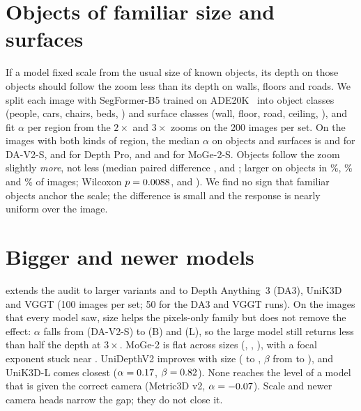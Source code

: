 \documentclass[10pt,twocolumn,letterpaper]{article}
\begin{document}



\section{Objects of familiar size and surfaces}\label{sec:supp_regions}

If a model fixed scale from the usual size of known objects, its depth on those objects should follow the zoom
less than its depth on walls, floors and roads. We split each image with SegFormer-B5 trained on
ADE20K~\cite{xie2021segformer} into object classes (people, cars, chairs, beds, \etc) and surface classes (wall,
floor, road, ceiling, \etc), and fit $\alpha$ per region from the $2\times$ and $3\times$ zooms on the 200
images per set. On the \DavTwoSRegionPairs{} images with both kinds of region, the median $\alpha$ on objects and
surfaces is \DavTwoSRegionObject{} and \DavTwoSRegionSurface{} for DA-V2-S, \DepthproRegionObject{} and
\DepthproRegionSurface{} for Depth Pro, and \MogeTwoSRegionObject{} and \MogeTwoSRegionSurface{} for MoGe-2-S.
Objects follow the zoom slightly \emph{more}, not less (median paired difference \DavTwoSRegionDiff,
\DepthproRegionDiff{} and \MogeTwoSRegionDiff; larger on objects in \DavTwoSRegionObjectLarger\%,
\DepthproRegionObjectLarger\% and \MogeTwoSRegionObjectLarger\% of images; Wilcoxon $p=0.0088$,
\DepthproRegionP{} and \MogeTwoSRegionP). We find no sign that familiar objects anchor the scale; the difference
is small and the response is nearly uniform over the image.

\section{Bigger and newer models}

 extends the audit to larger variants and to Depth Anything~3 (DA3),
UniK3D and VGGT
(100 images per set; 50 for the DA3 and VGGT runs). On the \nLadderShared{} images that every model saw,
size helps the pixels-only family but does not remove the effect: $\alpha$ falls from \DavTwoSAlphaShared{}
(DA-V2-S) to \DavTwoBAlphaShared{} (B) and \DavTwoLAlphaShared{} (L), so the large model still returns less
than half the depth at $3\times$. MoGe-2 is flat across sizes (\MogeTwoSAlphaShared, \MogeTwoBAlphaShared,
\MogeTwoLAlphaShared), with a focal exponent stuck near \MogeTwoLBetaShared. UniDepthV2 improves with size
(\UnidepthTwoSAlphaShared{} to \UnidepthTwoLAlphaShared, $\beta$ from \UnidepthTwoSBetaShared{} to
\UnidepthTwoLBetaShared), and UniK3D-L comes closest
($\alpha=0.17$, $\beta=0.82$). None reaches the level of a model that
is given the correct camera (Metric3D v2, $\alpha=-0.07$). Scale and newer camera heads
narrow the gap; they do not close it.
\end{document}
